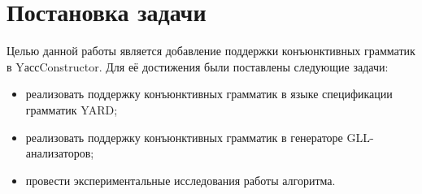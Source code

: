 \section{Постановка задачи}

Целью данной работы является добавление поддержки конъюнктивных грамматик в YассConstructor. Для её достижения были поставлены следующие задачи:

\begin{itemize}
    \item реализовать поддержку конъюнктивных грамматик в языке спецификации грамматик YARD;
    \item реализовать поддержку конъюнктивных грамматик в генераторе GLL-анализаторов;
    \item провести экспериментальные исследования работы алгоритма.
\end{itemize}

